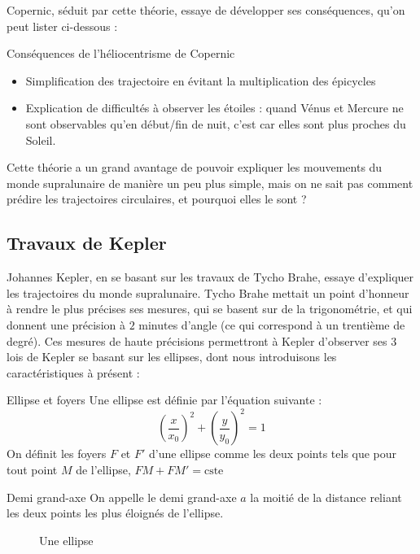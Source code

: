 \documentclass{classe}
\newcommand{\point}[3]{\draw (#1 -.1, #2 -.1) -- (#1 + .1, #2 + .1);
\draw (#1 +.1, #2 -.1) -- (#1 - .1, #2 + .1);
\draw (#1, #2) node[below right]{#3};}
\begin{document}
Copernic, séduit par cette théorie, essaye de développer ses conséquences, qu'on peut lister ci-dessous :
\begin{propositionfr}{Conséquences de l'héliocentrisme de Copernic}{}
\begin{itemize}
\item Simplification des trajectoire en évitant la multiplication des épicycles
\item Explication de difficultés à observer les étoiles : quand Vénus et Mercure ne sont observables qu'en début/fin de nuit, c'est car elles sont plus proches du Soleil.
\end{itemize}
\end{propositionfr}

Cette théorie a un grand avantage de pouvoir expliquer les mouvements du monde supralunaire de manière un peu plus simple, mais on ne sait pas comment prédire les trajectoires circulaires, et pourquoi elles le sont ?

\subsection{Travaux de Kepler}

Johannes Kepler, en se basant sur les travaux de Tycho Brahe, essaye d'expliquer les trajectoires du monde supralunaire. Tycho Brahe mettait un point d'honneur à rendre le plus précises ses mesures, qui se basent sur de la trigonométrie, et qui donnent une précision à $2$ minutes d'angle (ce qui correspond à un trentième de degré). Ces mesures de haute précisions permettront à Kepler d'observer ses 3 lois de Kepler se basant sur les ellipses, dont nous introduisons les caractéristiques à présent :

\begin{définition}{Ellipse et foyers}{}
	Une ellipse est définie par l'équation suivante :
	$$\left(\frac{x}{x_0}\right)^2 + \left(\frac{y}{y_0}\right)^2 = 1$$
	On définit les foyers $F$ et $F'$ d'une ellipse comme les deux points tels que pour tout point $M$ de l'ellipse, $FM + FM' = \textrm{cste}$
\end{définition}

\begin{définition}{Demi grand-axe}{}
	On appelle le demi grand-axe $a$ la moitié de la distance reliant les deux points les plus éloignés de l'ellipse.
\end{définition}

\begin{figure}[H]
\centering
{}
\caption{Une ellipse}
\end{figure}
\end{document}
